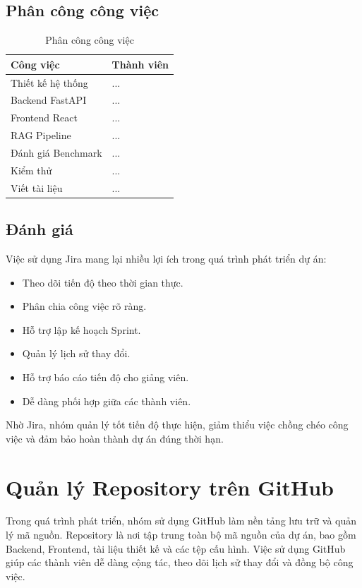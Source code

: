 \section{Phân công công việc}

\begin{table}[H]
	\centering
	\begin{tabular}{|p{5cm}|p{5cm}|}
		\hline
		Công việc & Thành viên\\
		\hline
		Thiết kế hệ thống &...\\
		Backend FastAPI & ...\\
		Frontend React & ...\\
		RAG Pipeline & ...\\
		Đánh giá Benchmark &...\\
		Kiểm thử & ...\\
		Viết tài liệu & ...\\
		\hline
	\end{tabular}
	\caption{Phân công công việc}
\end{table}
\section{Đánh giá}

Việc sử dụng Jira mang lại nhiều lợi ích trong quá trình phát triển dự án:

\begin{itemize}
	\item Theo dõi tiến độ theo thời gian thực.
	\item Phân chia công việc rõ ràng.
	\item Hỗ trợ lập kế hoạch Sprint.
	\item Quản lý lịch sử thay đổi.
	\item Hỗ trợ báo cáo tiến độ cho giảng viên.
	\item Dễ dàng phối hợp giữa các thành viên.
\end{itemize}

Nhờ Jira, nhóm quản lý tốt tiến độ thực hiện, giảm thiểu việc chồng chéo công việc và đảm bảo hoàn thành dự án đúng thời hạn.

\chapter{Quản lý Repository trên GitHub}

Trong quá trình phát triển, nhóm sử dụng GitHub làm nền tảng lưu trữ và quản lý mã nguồn. Repository là nơi tập trung toàn bộ mã nguồn của dự án, bao gồm Backend, Frontend, tài liệu thiết kế và các tệp cấu hình. Việc sử dụng GitHub giúp các thành viên dễ dàng cộng tác, theo dõi lịch sử thay đổi và đồng bộ công việc.

